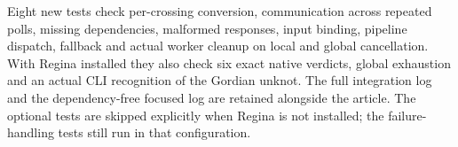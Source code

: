 Eight new tests check per-crossing conversion, communication across repeated
polls, missing dependencies, malformed responses, input binding, pipeline
dispatch, fallback and actual worker cleanup on local and global cancellation.
With Regina installed they also check six exact native verdicts, global
exhaustion and an actual CLI recognition of the Gordian unknot.  The full
integration log and the dependency-free focused log are retained alongside
the article.  The optional tests are skipped explicitly when Regina is
not installed; the failure-handling tests still run in that configuration.
